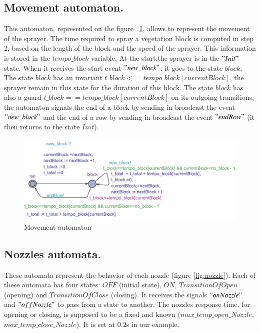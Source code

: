  \subsection{\textbf{Movement automaton.}} This automaton, represented on the figure ~\ref{fig:dep}, allows to represent the movement of the sprayer. The time required to spray a vegetation block is computed in step 2, based on the length of the block and the speed of the sprayer. This information is stored in the $ tempo\_block $ variable. At the start,the sprayer is in the $"Init"$ state. When it receives the start event $"new\_block"$, it goes to the state $ block $. The state $ block $ has an invariant $ t\_block <= tempo\_block [currentBlock] $, the sprayer remain in this state for the duration of this block. The state $ block $ has also a guard $ t\_block == tempo\_block [currentBlock ] $ on its outgoing transitions, the automaton signals the end of a block by sending in broadcast the event $"new\_block"$ and the end of a row by sending in broadcast the event $"endRow"$ (it then returns to the state $ Init $).
\begin{figure}[h!]
\begin{center}
\includegraphics[scale=0.6, angle =90 ]{dep.pdf}
\caption{Movement automaton} 
\label{fig:dep}
\end{center}
\end{figure}

\subsection{\textbf{Nozzles automata.}} These automata represent the behavior of each nozzle (figure \ref{fig:nozzle}). Each of these automata has four states: $OFF$ (initial state), $ON$, $TransitionOfOpen$ (opening) and $TransitionOfClose$ (closing). It receives the signals $"onNozzle"$ and $"offNozzle"$ to pass from a state to another. 
The nozzles response time, for opening or closing, is supposed to be a fixed and known ($ max \_temp\_open\_Nozzle $, $ max\_temp\_close\_Nozzle $). It is set at 0.2s in our example.


